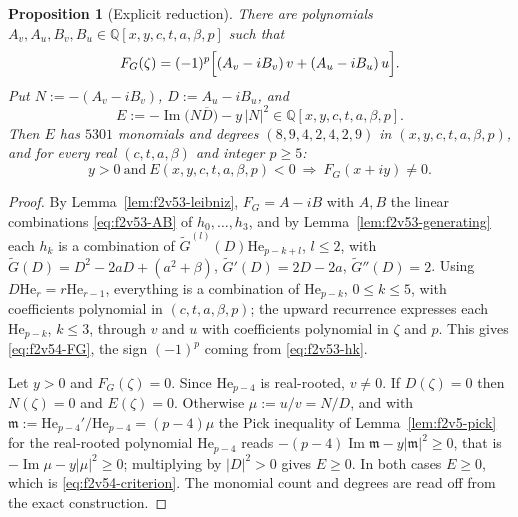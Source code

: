 \documentclass[11pt]{article}
\newtheorem{proposition}[theorem]{Proposition}
\theoremstyle{definition}
\theoremstyle{remark}
\begin{document}
\begin{proposition}[Explicit reduction]
\label{prop:f2v54-reduction}
There are polynomials \(A_v,A_u,B_v,B_u\in\mathbb Q[x,y,c,t,a,\beta,p]\)
such that
\begin{equation}
 F_G(\zeta)=(-1)^p\Bigl[(A_v-iB_v)\,v+(A_u-iB_u)\,u\Bigr].
 \label{eq:f2v54-FG}
\end{equation}
Put \(N:=-(A_v-iB_v)\), \(D:=A_u-iB_u\), and
\begin{equation}
 E:=-\operatorname{Im}\bigl(N\overline D\bigr)-y\,|N|^2
 \in\mathbb Q[x,y,c,t,a,\beta,p].
 \label{eq:f2v54-E}
\end{equation}
Then \(E\) has \(5301\) monomials and degrees \((8,9,4,2,4,2,9)\) in
\((x,y,c,t,a,\beta,p)\), and for every real \((c,t,a,\beta)\) and
integer \(p\ge5\):
\begin{equation}
 \boxed{\;y>0\ \text{and}\ E(x,y,c,t,a,\beta,p)<0\ \Longrightarrow\ F_G(x+iy)\ne0.\;}
 \label{eq:f2v54-criterion}
\end{equation}
\end{proposition}

\begin{proof}
By Lemma~\ref{lem:f2v53-leibniz}, \(F_G=A-iB\) with \(A,B\) the linear
combinations \eqref{eq:f2v53-AB} of \(h_0,\ldots,h_3\), and by
Lemma~\ref{lem:f2v53-generating} each \(h_k\) is a combination of
\(\widetilde G^{(l)}(D)\mathrm{He}_{p-k+l}\), \(l\le2\), with
\(\widetilde G(D)=D^2-2aD+(a^2+\beta)\), \(\widetilde G'(D)=2D-2a\),
\(\widetilde G''(D)=2\).  Using \(D\mathrm{He}_r=r\mathrm{He}_{r-1}\),
everything is a combination of \(\mathrm{He}_{p-k}\), \(0\le k\le5\),
with coefficients polynomial in \((c,t,a,\beta,p)\); the upward
recurrence expresses each \(\mathrm{He}_{p-k}\), \(k\le3\), through
\(v\) and \(u\) with coefficients polynomial in \(\zeta\) and \(p\).  This
gives \eqref{eq:f2v54-FG}, the sign \((-1)^p\) coming from
\eqref{eq:f2v53-hk}.

Let \(y>0\) and \(F_G(\zeta)=0\).  Since \(\mathrm{He}_{p-4}\) is
real-rooted, \(v\ne0\).  If \(D(\zeta)=0\) then \(N(\zeta)=0\) and
\(E(\zeta)=0\).  Otherwise \(\mu:=u/v=N/D\), and with
\(\mathfrak m:=\mathrm{He}_{p-4}'/\mathrm{He}_{p-4}=(p-4)\mu\) the Pick
inequality of Lemma~\ref{lem:f2v5-pick} for the real-rooted polynomial
\(\mathrm{He}_{p-4}\) reads \(-(p-4)\operatorname{Im}\mathfrak m
 -y|\mathfrak m|^2\ge0\), that is \(-\operatorname{Im}\mu-y|\mu|^2\ge0\);
multiplying by \(|D|^2>0\) gives \(E\ge0\).  In both cases \(E\ge0\),
which is \eqref{eq:f2v54-criterion}.  The monomial count and degrees are
read off from the exact construction.
\end{proof}
\end{document}
